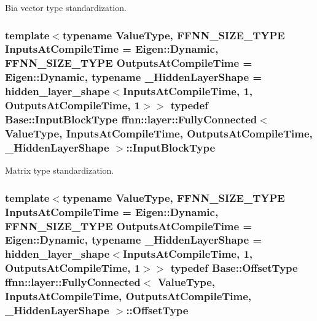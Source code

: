 Bia vector type standardization. 

\hypertarget{classffnn_1_1layer_1_1_fully_connected_a1360eaafde26c8b36ddb6fe4095b6119}{
\subsubsection[{Input\-Block\-Type}]{\setlength{\rightskip}{0pt plus 5cm}template$<$typename Value\-Type, F\-F\-N\-N\-\_\-\-S\-I\-Z\-E\-\_\-\-T\-Y\-P\-E Inputs\-At\-Compile\-Time = Eigen\-::\-Dynamic, F\-F\-N\-N\-\_\-\-S\-I\-Z\-E\-\_\-\-T\-Y\-P\-E Outputs\-At\-Compile\-Time = Eigen\-::\-Dynamic, typename \-\_\-\-Hidden\-Layer\-Shape = hidden\-\_\-layer\-\_\-shape$<$\-Inputs\-At\-Compile\-Time, 1, Outputs\-At\-Compile\-Time, 1$>$$>$ typedef {\bf Base\-::\-Input\-Block\-Type} {\bf ffnn\-::layer\-::\-Fully\-Connected}$<$ Value\-Type, Inputs\-At\-Compile\-Time, Outputs\-At\-Compile\-Time, \-\_\-\-Hidden\-Layer\-Shape $>$\-::{\bf Input\-Block\-Type}}}\label{classffnn_1_1layer_1_1_fully_connected_a1360eaafde26c8b36ddb6fe4095b6119}


Matrix type standardization. 

\hypertarget{classffnn_1_1layer_1_1_fully_connected_a0f5ae1a0bd038f404410ce2af1054833}{
\subsubsection[{Offset\-Type}]{\setlength{\rightskip}{0pt plus 5cm}template$<$typename Value\-Type, F\-F\-N\-N\-\_\-\-S\-I\-Z\-E\-\_\-\-T\-Y\-P\-E Inputs\-At\-Compile\-Time = Eigen\-::\-Dynamic, F\-F\-N\-N\-\_\-\-S\-I\-Z\-E\-\_\-\-T\-Y\-P\-E Outputs\-At\-Compile\-Time = Eigen\-::\-Dynamic, typename \-\_\-\-Hidden\-Layer\-Shape = hidden\-\_\-layer\-\_\-shape$<$\-Inputs\-At\-Compile\-Time, 1, Outputs\-At\-Compile\-Time, 1$>$$>$ typedef Base\-::\-Offset\-Type {\bf ffnn\-::layer\-::\-Fully\-Connected}$<$ Value\-Type, Inputs\-At\-Compile\-Time, Outputs\-At\-Compile\-Time, \-\_\-\-Hidden\-Layer\-Shape $>$\-::{\bf Offset\-Type}}}\label{classffnn_1_1layer_1_1_fully_connected_a0f5ae1a0bd038f404410ce2af1054833}


